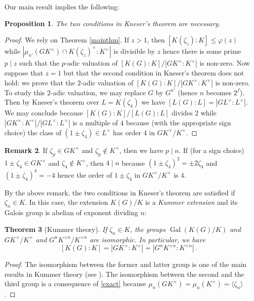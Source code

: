 \documentclass[11pt, a4paper]{amsart}
\newtheorem {thm}{Theorem}
\newtheorem {prop}[thm]{Proposition}
\theoremstyle{definition}
\newtheorem {rem}[thm]{Remark}
\DeclareMathOperator{\Gal}{Gal}
\renewcommand{\leq}{\leqslant}
\begin{document}
Our main result implies the following: 

\begin{prop}
The two conditions in Kneser's theorem are necessary. 
\end{prop}
\begin{proof}
We rely on Theorem \ref{mainthm}.
If $z>1$, then $[K(\zeta_z):K]\leq \varphi(z)$ while 
$|\mu_{n'}(G K^\times)\cap K(\zeta_{z})^\times:K^\times|$ is divisible by $z$ hence there is some prime $p\mid z$ such that the $p$-adic valuation of $[K(G):K]/|GK^\times:K^\times|$ is non-zero. Now suppose that $z=1$ but that the second condition in Kneser's theorem does not hold: we prove that the $2$-adic valuation of $[K(G):K]/|GK^\times:K^\times|$ is non-zero. To study this $2$-adic valuation, we may replace $G$ by $G^{n'}$ (hence $n$ becomes $2^f$). Then by Kneser's theorem over $L=K(\zeta_4)$ we have 
$[L(G):L]=|GL^\times:L^\times|$. We may conclude because $[K(G):K]/[L(G):L]$ divides $2$ while $|GK^\times:K^\times|/|GL^\times:L^\times|$ is a multiple of $4$ because (with the appropriate sign choice) the class of $(1\pm \zeta_4)\in L^\times$ has order $4$ in 
$GK^\times/K^\times$.
\end{proof}

\begin{rem}\label{Knesercondi}
If $\zeta_p\in GK^\times$ and $\zeta_p\notin K^\times$, then we have $p\mid n$. If (for a sign choice) $1\pm \zeta_4\in GK^\times$ and $\zeta_4\notin K^\times$, then $4\mid n$ because  
$(1\pm \zeta_4)^2=\pm 2\zeta_4$ and $(1\pm \zeta_4)^4=-4$  hence the order of $1\pm \zeta_4$ in $GK^\times/K^\times$ is $4$. 
\end{rem}

By the above remark, the two conditions in Kneser's theorem are satisfied if $\zeta_n\in K$.
In this case, the extension $K(G)/K$ is a \emph{Kummer extension} and its Galois group is abelian of exponent dividing $n$:

\begin{thm}[Kummer theory]
    If $\zeta_n\in K$, the groups $\Gal(K(G)/K)$ and $GK^\times/K^\times$ and $G^nK^{\times n}/K^{\times n}$ are isomorphic. In particular, we have
    \begin{equation}\label{all} [K(G):K]=|GK^\times:K^\times|=|G^nK^{\times n}:K^{\times n}|\,.
    \end{equation}
\end{thm}
\begin{proof}
The isomorphism between the former and latter group is one of the main results in Kummer theory (see \cite[Theorem 8.1, Chapter VI]{LangAlgebra}). The isomorphism between the second and the third group is a consequence of \eqref{exact} because $\mu_n(GK^\times)=\mu_n(K^\times)=\langle \zeta_n\rangle$.
\end{proof}
\end{document}
